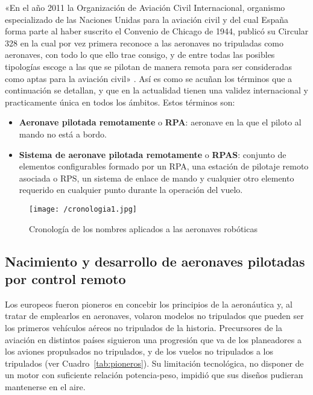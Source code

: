 «En el año 2011 la Organización de Aviación Civil Internacional, organismo especializado de las Naciones 
Unidas para la aviación civil y del cual España forma parte al haber suscrito el Convenio de Chicago de 1944, 
publicó su Circular 328 en la cual por vez primera reconoce a las aeronaves no tripuladas como aeronaves, 
con todo lo que ello trae consigo, y de entre todas las posibles tipologías escoge a las que se pilotan de manera 
remota para ser consideradas como aptas para la aviación civil» \cite{dron1}. Así es como se acuñan los términos que a continuación se detallan, y que en la actualidad tienen una validez internacional y practicamente única en todos los ámbitos. Estos términos son:

\begin{itemize}
\item \textbf{Aeronave pilotada remotamente} o \textbf{\acs{RPA}}: aeronave en la que el piloto al mando no está a bordo.
\item \textbf{Sistema de aeronave pilotada remotamente} o \textbf{\acs{RPAS}}: conjunto de elementos configurables formado por un \acs{RPA}, 
una estación de pilotaje remoto asociada o \acs{RPS}, un sistema de enlace de mando y cualquier otro elemento requerido en cualquier 
punto durante la operación del vuelo.
\end{itemize}

\begin{figure}[!h]
\begin{center}
\texttt{[image: /cronologia1.jpg]}
\caption[Cronología de los nombres aplicados a las aeronaves robóticas]{Cronología de los nombres aplicados a las aeronaves robóticas \footnotemark}
\label{fig:cronologia}
\end{center}
\end{figure}


\subsection{Nacimiento y desarrollo de aeronaves pilotadas por control remoto}
\label{sec:historia}

Los europeos fueron pioneros en concebir los principios de la aeronáutica y, al 
tratar de emplearlos en aeronaves, volaron modelos no tripulados que pueden ser los primeros vehículos 
aéreos no tripulados de la historia. Precursores de la aviación en distintos países siguieron una progresión que va de los
planeadores a los aviones propulsados no tripulados, y de los vuelos no tripulados a los
tripulados (ver Cuadro~\ref{tab:pioneros}). Su limitación tecnológica, no disponer de un motor con suficiente relación potencia-peso, 
impidió que sus diseños pudieran mantenerse en el aire.

